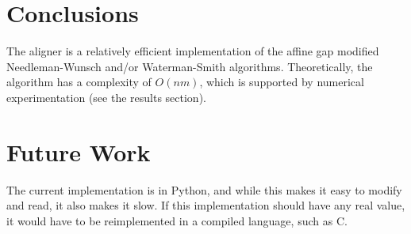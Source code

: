 \documentclass{article}
\begin{document}
\section*{Conclusions}
The aligner is a relatively efficient implementation of the affine gap modified Needleman-Wunsch and/or Waterman-Smith algorithms. Theoretically, the algorithm has a complexity of $O(nm)$, which is supported by numerical experimentation (see the results section).

\section*{Future Work}
The current implementation is in Python, and while this makes it easy to modify and read, it also makes it slow. If this implementation should have any real value, it would have to be reimplemented in a compiled language, such as C.



\end{document}
